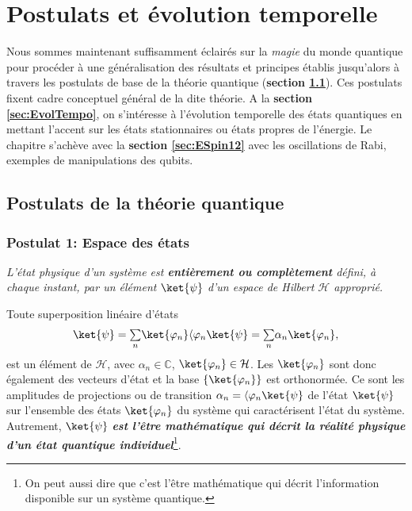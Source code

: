 \chapter{Postulats et évolution temporelle}
\label{chap:postu}
\minitoc

\bigskip


Nous sommes maintenant suffisamment éclairés sur la \emph{magie} du monde
quantique pour procéder à une généralisation des résultats et principes établis
jusqu'alors à travers les postulats de base de la théorie quantique
(\textbf{section \ref{sec:PostMQ}}). Ces postulats fixent cadre conceptuel
général de la dite théorie. A la \textbf{section \ref{sec:EvolTempo}}, on
s'intéresse à l'évolution temporelle des états quantiques en mettant l'accent
sur les états stationnaires ou états propres de l'énergie. Le chapitre s'achève
avec la \textbf{section \ref{sec:ESpin12}} avec les oscillations de Rabi,
exemples de manipulations des qubits.

\section{Postulats de la théorie quantique}
\label{sec:PostMQ}

\subsection{Postulat 1: Espace des états}

\colorbox[gray]{0.8}{
\parbox[c]{0.9\textwidth}{
\emph{L'état physique d'un système est \textbf{entièrement ou complètement}
défini, à chaque instant, par un élément $\ket{\psi}$ d'un espace de Hilbert
$\mathcal{H}$ approprié.}
}}
\medskip

Toute superposition linéaire d'états
\begin{equation}
\ket{\psi}={\textstyle\sum\limits_n}\ket{\varphi_n}
\langle\varphi_n\ket{\psi} ={\textstyle\sum\limits_n}
\alpha_n\ket{\varphi_n},
\end{equation}
est un élément de $\mathcal{H}$, avec $\alpha_n\in\mathbb{C}$,
$\ket{\varphi_n}\in\mathcal{H}$. Les $\ket{\varphi_n}$ sont donc également
des vecteurs d'état et la base $\{\ket{\varphi_n}\}$ est orthonormée. Ce sont
les amplitudes de projections ou de transition $\alpha_n=\langle
\varphi_n\ket{\psi}$ de l'état $\ket{\psi}$ sur l'ensemble des états
$\ket{\varphi_n} $ du système qui caractérisent l'état du système. Autrement,
$\ket{\psi}$ \emph{\textbf{est l'être mathématique qui décrit la réalité
physique d'un état quantique individuel}}\footnote{On peut aussi dire que c'est
l'être mathématique qui décrit l'information disponible sur un système
quantique.}.

